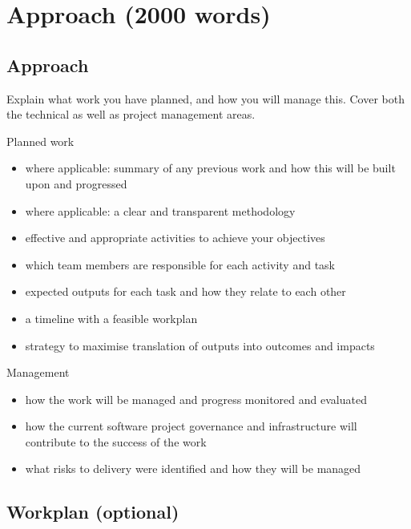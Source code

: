 \documentclass[12pt]{article}
\newenvironment{instruction}{%
    \begin{tcolorbox}[colback=red!5,colframe=red,title=Instruction]%
}{%
    \end{tcolorbox}%
}
\begin{document}
\section*{Approach (2000 words)}

\subsection*{Approach}

\begin{instruction}

Explain what work you have planned, and how you will manage this. Cover both the technical as well as project management areas.

Planned work

    \begin{itemize}
        \item where applicable: summary of any previous work and how this will be built upon and progressed
        \item where applicable: a clear and transparent methodology
        \item effective and appropriate activities to achieve your objectives
        \item which team members are responsible for each activity and task
        \item expected outputs for each task and how they relate to each other
        \item a timeline with a feasible workplan
        \item strategy to maximise translation of outputs into outcomes and impacts
    \end{itemize}

Management

    \begin{itemize}
        \item how the work will be managed and progress monitored and evaluated
        \item how the current software project governance and infrastructure will contribute to the success of the work
        \item what risks to delivery were identified and how they will be managed
    \end{itemize}


\end{instruction}



\subsection*{Workplan (optional)}
\end{document}
